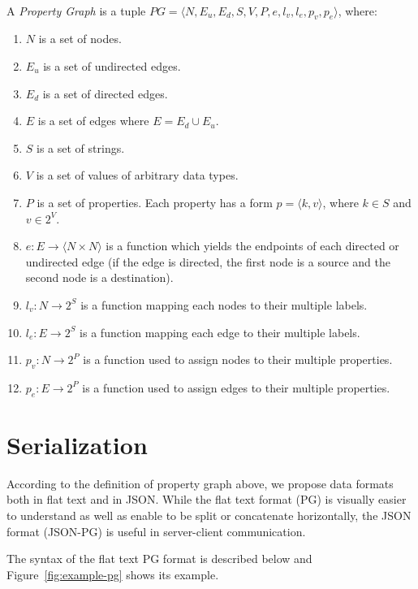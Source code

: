 \documentclass[runningheads]{llncs}
\begin{document}
\begin{defi}
\leavevmode \vspace{1mm} \\
A \emph{Property Graph} is a tuple
$PG = \langle N, E_u, E_d, S, V, P, e, l_v, l_e, p_v, p_e\rangle$, where:
\begin{enumerate}
    \item $N$ is a set of nodes.
    \item $E_u$ is a set of undirected edges.
    \item $E_d$ is a set of directed edges.
    \item $E$ is a set of edges where $E = E_d \cup E_u$.
    \item $S$ is a set of strings.
    \item $V$ is a set of values of arbitrary data types.
    \item $P$ is a set of properties. Each property has a form $p = \langle k,v \rangle$, where $k \in S$ and $v \in 2^V$.
    \item $e: E \to \langle N \times N \rangle$ is a function which yields the endpoints of each directed or undirected edge (if the edge is directed, the first node is a source and the second node is a destination).
    \item $l_v : N \to 2^S$ is a function mapping each nodes to their multiple labels.
    \item $l_e : E \to 2^S$ is a function mapping each edge to their multiple labels.
    \item $p_v : N \to 2^P$ is a function used to assign nodes to their multiple properties.
    \item $p_e : E \to 2^P$ is a function used to assign edges to their multiple properties.
\end{enumerate}
\end{defi}

\section{Serialization}
According to the definition of property graph above, we propose data formats both in flat text and in JSON. While the flat text format (PG) is visually easier to understand as well as enable to be split or concatenate horizontally, the JSON format (JSON-PG) is useful in server-client communication.

The syntax of the flat text PG format is described below and Figure~\ref{fig:example-pg} shows its example.
\end{document}
